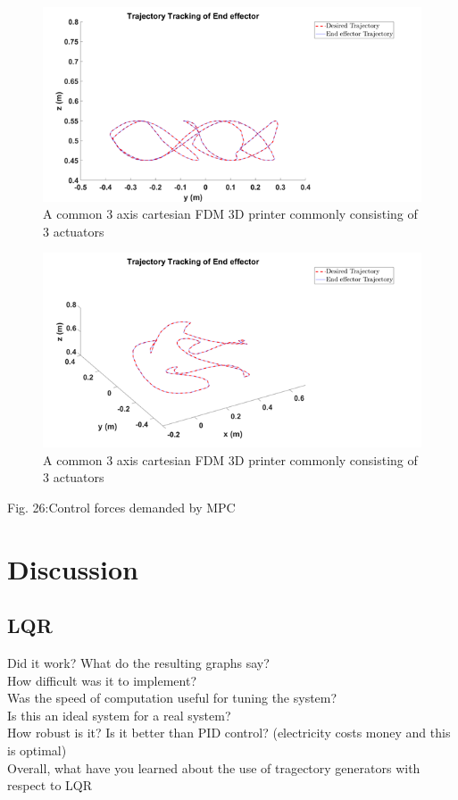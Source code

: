 \documentclass{UoNMCHA}
\numberwithin{equation}{section}
\begin{document}
	\begin{figure}[H]
		\begin{center}
			\includegraphics[width=.8\linewidth]{figs/Picture392}
			\caption{A  common 3 axis cartesian FDM 3D printer commonly consisting of 3 actuators}
			\label{figs/Picture382}
		\end{center}
	\end{figure}
	
	\begin{figure}[H]
		\begin{center}
			\includegraphics[width=.8\linewidth]{figs/Picture393}
			\caption{A  common 3 axis cartesian FDM 3D printer commonly consisting of 3 actuators}
			\label{figs/Picture383}
		\end{center}
	\end{figure}
	Fig. 26:Control forces demanded by MPC
	
	
	\section{Discussion}
	
	\subsection{LQR}
	
	Did it work? What do the resulting graphs say?\\
	How difficult was it to implement?\\
	Was the speed of computation useful for tuning the system?\\
	Is this an ideal system for a real system?\\
	How robust is it? Is it better than PID control? (electricity costs money and this is optimal)\\
	Overall, what have you learned about the use of tragectory generators with respect to LQR\\
	
\end{document}
